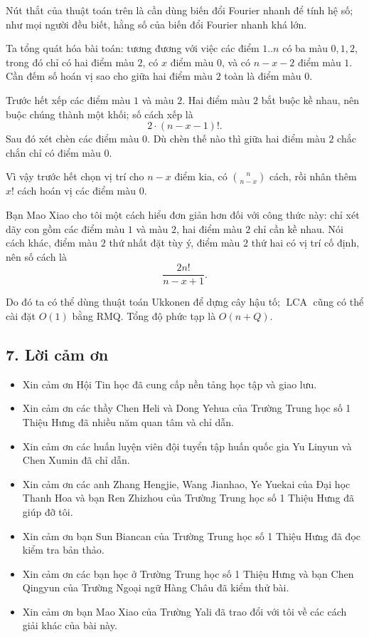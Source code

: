\documentclass[11pt]{article}
\begin{document}
Nút thắt của thuật toán trên là cần dùng biến đổi Fourier nhanh để tính hệ số;
như mọi người đều biết, hằng số của biến đổi Fourier nhanh khá lớn.

Ta tổng quát hóa bài toán: tương đương với việc các điểm \(1..n\) có ba màu
\(0,1,2\), trong đó chỉ có hai điểm màu \(2\), có \(x\) điểm màu \(0\), và có
\(n-x-2\) điểm màu \(1\). Cần đếm số hoán vị sao cho giữa hai điểm màu \(2\)
toàn là điểm màu \(0\).

Trước hết xếp các điểm màu \(1\) và màu \(2\). Hai điểm màu \(2\) bắt buộc kề
nhau, nên buộc chúng thành một khối; số cách xếp là
\[
  2\cdot (n-x-1)!.
\]
Sau đó xét chèn các điểm màu \(0\). Dù chèn thế nào thì giữa hai điểm màu
\(2\) chắc chắn chỉ có điểm màu \(0\).

Vì vậy trước hết chọn vị trí cho \(n-x\) điểm kia, có
\(\binom{n}{n-x}\) cách, rồi nhân thêm \(x!\) cách hoán vị các điểm màu \(0\).

Bạn Mao Xiao cho tôi một cách hiểu đơn giản hơn đối với công thức này: chỉ
xét dãy con gồm các điểm màu \(1\) và màu \(2\), hai điểm màu \(2\) chỉ cần
kề nhau. Nói cách khác, điểm màu \(2\) thứ nhất đặt tùy ý, điểm màu \(2\) thứ
hai có vị trí cố định, nên số cách là
\[
  \frac{2n!}{n-x+1}.
\]

Do đó ta có thể dùng thuật toán Ukkonen để dựng cây hậu tố; \(\operatorname{LCA}\)
cũng có thể cài đặt \(O(1)\) bằng RMQ. Tổng độ phức tạp là \(O(n+Q)\).

\subsection*{7. Lời cảm ơn}

\begin{itemize}
  \item Xin cảm ơn Hội Tin học đã cung cấp nền tảng học tập và giao lưu.
  \item Xin cảm ơn các thầy Chen Heli và Dong Yehua của Trường Trung học số 1
  Thiệu Hưng đã nhiều năm quan tâm và chỉ dẫn.
  \item Xin cảm ơn các huấn luyện viên đội tuyển tập huấn quốc gia Yu Linyun
  và Chen Xumin đã chỉ dẫn.
  \item Xin cảm ơn các anh Zhang Hengjie, Wang Jianhao, Ye Yuekai của Đại học
  Thanh Hoa và bạn Ren Zhizhou của Trường Trung học số 1 Thiệu Hưng đã giúp
  đỡ tôi.
  \item Xin cảm ơn bạn Sun Biancan của Trường Trung học số 1 Thiệu Hưng đã đọc
  kiểm tra bản thảo.
  \item Xin cảm ơn các bạn học ở Trường Trung học số 1 Thiệu Hưng và bạn Chen
  Qingyun của Trường Ngoại ngữ Hàng Châu đã kiểm thử bài.
  \item Xin cảm ơn bạn Mao Xiao của Trường Yali đã trao đổi với tôi về các
  cách giải khác của bài này.
\end{itemize}
\end{document}
